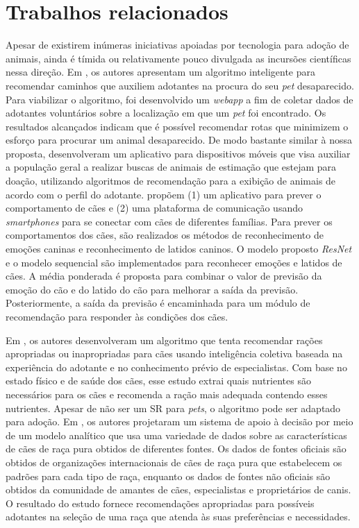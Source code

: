 \documentclass[portuguese]{textolivre}
\begin{document}
\section{Trabalhos relacionados} \label{cap:tr}

Apesar de existirem inúmeras iniciativas apoiadas por tecnologia para adoção de animais, ainda é tímida ou relativamente pouco divulgada as incursões científicas nessa direção. Em \textcite{souza2022fugapet}, os autores apresentam um algoritmo inteligente para recomendar caminhos que auxiliem adotantes na procura do seu \textit{pet} desaparecido. Para viabilizar o algoritmo, foi desenvolvido um \textit{webapp} a fim de coletar dados de adotantes voluntários sobre a localização em que um \textit{pet} foi encontrado. Os resultados alcançados indicam que é possível recomendar rotas que minimizem o esforço para procurar um animal desaparecido. De modo bastante similar à nossa proposta, \textcite{de2021pet} desenvolveram um aplicativo para dispositivos móveis que visa auxiliar a população geral a realizar buscas de animais de estimação que estejam para doação, utilizando algoritmos de recomendação para a exibição de animais de acordo com o perfil do adotante. \textcite{s22186759} propõem (1) um aplicativo para prever o comportamento de cães e (2) uma plataforma de comunicação usando \textit{smartphones} para se conectar com cães de diferentes famílias. Para prever os comportamentos dos cães, são realizados os métodos de reconhecimento de emoções caninas e reconhecimento de latidos caninos. O modelo  proposto \textit{ResNet} e o modelo sequencial são implementados para reconhecer emoções e latidos de cães. A média ponderada é proposta para combinar o valor de previsão da emoção do cão e do latido do cão para melhorar a saída da previsão. Posteriormente, a saída da previsão é encaminhada para um módulo de recomendação para responder às condições dos cães.

Em \textcite{foodDog}, os autores desenvolveram um algoritmo que tenta recomendar rações apropriadas ou inapropriadas para cães usando inteligência coletiva baseada na experiência do adotante e no conhecimento prévio de especialistas. Com base no estado físico e de saúde dos cães, esse estudo extrai quais nutrientes são necessários para os cães e recomenda a ração mais adequada contendo esses nutrientes. Apesar de não ser um SR para \textit{pets}, o algoritmo pode ser adaptado para adoção. Em \textcite{Chyan2020}, os autores projetaram um sistema de apoio à decisão por meio de um modelo analítico que usa uma variedade de dados sobre as características de cães de raça pura obtidos de diferentes fontes. Os dados de fontes oficiais são obtidos de organizações internacionais de cães de raça pura que estabelecem os padrões para cada tipo de raça, enquanto os dados de fontes não oficiais são obtidos da comunidade de amantes de cães, especialistas e proprietários de canis. O resultado do estudo fornece recomendações apropriadas para possíveis adotantes na seleção de uma raça que atenda às suas preferências e necessidades. 
\end{document}

